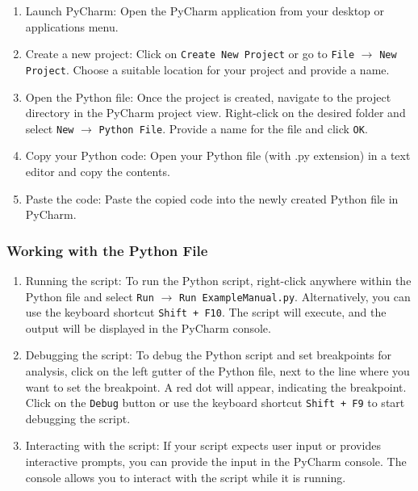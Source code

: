 \begin{enumerate}
    
    \item Launch PyCharm: Open the PyCharm application from your desktop or applications menu.
    
    \item Create a new project: Click on \texttt{Create New Project} or go to \texttt{File} $\rightarrow$ \texttt{New Project}. Choose a suitable location for your project and provide a name.
    
    \item Open the Python file: Once the project is created, navigate to the project directory in the PyCharm project view. Right-click on the desired folder and select \texttt{New} $\rightarrow$ \texttt{Python File}. Provide a name for the file and click \texttt{OK}.
    
    \item Copy your Python code: Open your Python file (with .py extension) in a text editor and copy the contents.
    
    \item Paste the code: Paste the copied code into the newly created Python file in PyCharm.
    
\end{enumerate}

\subsubsection{Working with the Python File}

\begin{enumerate}
    
    \item Running the script: To run the Python script, right-click anywhere within the Python file and select \texttt{Run} $\rightarrow$ \texttt{Run ExampleManual.py}. Alternatively, you can use the keyboard shortcut \texttt{Shift + F10}. The script will execute, and the output will be displayed in the PyCharm console.
    
    \item Debugging the script: To debug the Python script and set breakpoints for analysis, click on the left gutter of the Python file, next to the line where you want to set the breakpoint. A red dot will appear, indicating the breakpoint. Click on the \texttt{Debug} button or use the keyboard shortcut \texttt{Shift + F9} to start debugging the script.
    
    \item Interacting with the script: If your script expects user input or provides interactive prompts, you can provide the input in the PyCharm console. The console allows you to interact with the script while it is running.
    
\end{enumerate}


